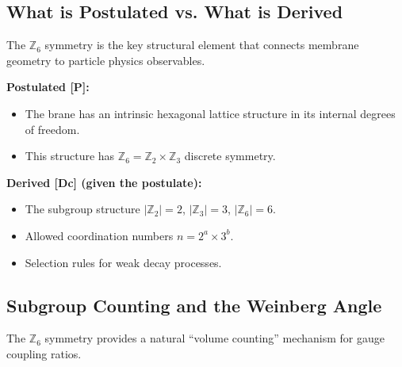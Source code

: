 \documentclass[11pt,a4paper]{article}
\begin{document}
\subsection{What is Postulated vs. What is Derived}

The $\mathbb{Z}_6$ symmetry is the key structural element that connects membrane geometry to particle physics observables.

\begin{statusbox}
\textbf{Postulated [P]:}
\begin{itemize}
    \item The brane has an intrinsic hexagonal lattice structure in its internal degrees of freedom.
    \item This structure has $\mathbb{Z}_6 = \mathbb{Z}_2 \times \mathbb{Z}_3$ discrete symmetry.
\end{itemize}

\textbf{Derived [Dc] (given the postulate):}
\begin{itemize}
    \item The subgroup structure $|\mathbb{Z}_2| = 2$, $|\mathbb{Z}_3| = 3$, $|\mathbb{Z}_6| = 6$.
    \item Allowed coordination numbers $n = 2^a \times 3^b$.
    \item Selection rules for weak decay processes.
\end{itemize}
\end{statusbox}

\subsection{Subgroup Counting and the Weinberg Angle}

The $\mathbb{Z}_6$ symmetry provides a natural ``volume counting'' mechanism for gauge coupling ratios.
\end{document}
